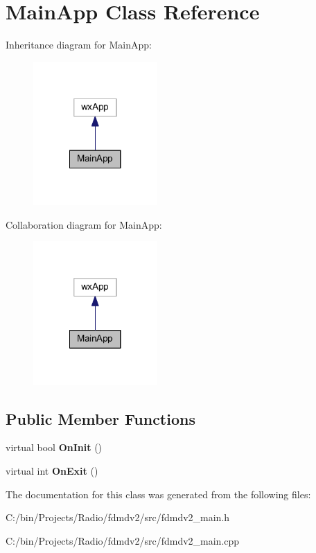 \hypertarget{class_main_app}{\section{Main\-App Class Reference}
\label{class_main_app}
}


Inheritance diagram for Main\-App\-:\nopagebreak
\begin{figure}[H]
\begin{center}
\leavevmode
\includegraphics[width=134pt]{class_main_app__inherit__graph}
\end{center}
\end{figure}


Collaboration diagram for Main\-App\-:\nopagebreak
\begin{figure}[H]
\begin{center}
\leavevmode
\includegraphics[width=134pt]{class_main_app__coll__graph}
\end{center}
\end{figure}
\subsection*{Public Member Functions}
\begin{DoxyCompactItemize}
\item 
\hypertarget{class_main_app_aff3d398e1b61f1016c37d57798f86731}{virtual bool {\bfseries On\-Init} ()}\label{class_main_app_aff3d398e1b61f1016c37d57798f86731}

\item 
\hypertarget{class_main_app_aff49a6bb4a0494d717a3136e9fe17351}{virtual int {\bfseries On\-Exit} ()}\label{class_main_app_aff49a6bb4a0494d717a3136e9fe17351}

\end{DoxyCompactItemize}


The documentation for this class was generated from the following files\-:\begin{DoxyCompactItemize}
\item 
C\-:/bin/\-Projects/\-Radio/fdmdv2/src/fdmdv2\-\_\-main.\-h\item 
C\-:/bin/\-Projects/\-Radio/fdmdv2/src/fdmdv2\-\_\-main.\-cpp\end{DoxyCompactItemize}
